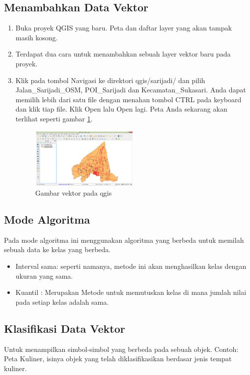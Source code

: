 \subsection{Menambahkan Data Vektor}
\begin{enumerate}
\item 
Buka proyek QGIS yang baru. Peta dan daftar layer yang akan tampak masih kosong.
\item
Terdapat dua cara untuk menambahkan sebuah layer vektor baru pada proyek.
\item
Klik pada tombol Navigasi ke direktori qgis/sarijadi/ dan pilih Jalan\_Sarijadi\_OSM, POI\_Sarijadi dan Kecamatan\_Sukasari. Anda dapat memilih lebih dari satu file dengan menahan tombol CTRL pada keyboard dan klik tiap file. Klik Open lalu Open lagi. Peta Anda sekarang akan terlihat seperti gambar \ref{vektor}.
\begin{figure}[ht]
    \centerline{\includegraphics[width=0.5\textwidth]{figures/vektor}}
    \caption{Gambar vektor pada qgis}
    \label{vektor}
    \end{figure}
\end{enumerate}


\subsection{Mode Algoritma}
Pada mode algoritma ini menggunakan algoritma yang berbeda untuk memilah sebuah data ke kelas yang berbeda.
\begin{itemize}
\item	Interval sama: seperti namanya, metode ini akan menghasilkan kelas dengan ukuran yang sama.
\item	Kuantil : Merupakan Metode untuk memutuskan kelas di mana jumlah nilai pada setiap kelas adalah sama.
\end{itemize}

\subsection{Klasifikasi Data Vektor}
Untuk menampilkan simbol-simbol yang berbeda pada sebuah objek. Contoh: Peta Kuliner, isinya objek yang telah diklasifikasikan berdasar jenis tempat kuliner.

